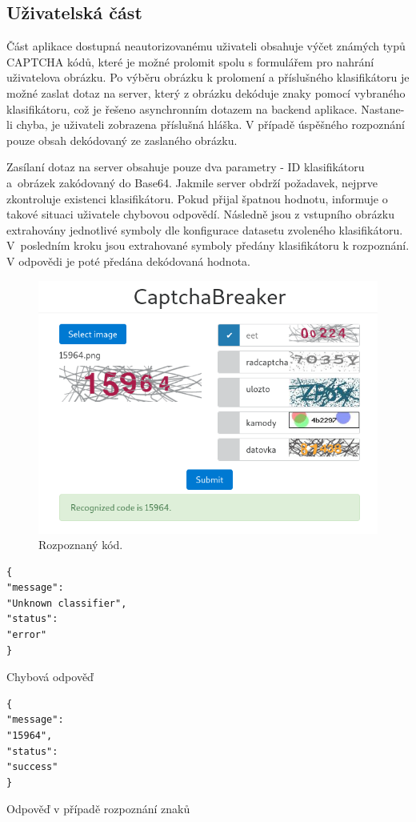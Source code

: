 \documentclass[
  field=ainfp,
  master=true,
  biblatex,
  sourcecodes=false,
  theorems=false,
  glossaries,
  index
]{kidiplom}
\begin{document}
\subsection{Uživatelská část}
Část aplikace dostupná neautorizovanému uživateli obsahuje výčet známých typů CAPTCHA kódů, které je možné prolomit spolu s formulářem pro nahrání uživatelova obrázku. Po výběru obrázku k prolomení a příslušného klasifikátoru je možné zaslat dotaz na server, který z obrázku dekóduje znaky pomocí vybraného klasifikátoru, což je řešeno asynchronním dotazem na backend aplikace. Nastane-li chyba, je uživateli zobrazena příslušná hláška. V případě úspěšného rozpoznání pouze obsah dekódovaný ze zaslaného obrázku.

Zasílaní dotaz na server obsahuje pouze dva parametry - ID klasifikátoru a~obrázek zakódovaný do Base64. Jakmile server obdrží požadavek, nejprve zkontroluje existenci klasifikátoru. Pokud přijal špatnou hodnotu, informuje o takové situaci uživatele chybovou odpovědí. Následně jsou z vstupního obrázku extrahovány jednotlivé symboly dle konfigurace datasetu zvoleného klasifikátoru. V~posledním kroku jsou extrahované symboly předány klasifikátoru k rozpoznání. V odpovědi je poté předána dekódovaná hodnota.

\begin{figure}[H]
  \centering
  \includegraphics[scale=0.6]{images/website_public.png}
  \caption{Rozpoznaný kód.}
  \label{fig:resolved}
\end{figure}

\begin{minipage}{0.45\textwidth}
\begin{verbatim}
{
"message":
"Unknown classifier",
"status":
"error"
}
\end{verbatim}
Chybová odpověď
\end{minipage}
\hfill
\begin{minipage}{0.45\textwidth}
\begin{verbatim}
{
"message":
"15964",
"status":
"success"
}
\end{verbatim}
Odpověď v případě rozpoznání znaků
\end{minipage}
\end{document}
